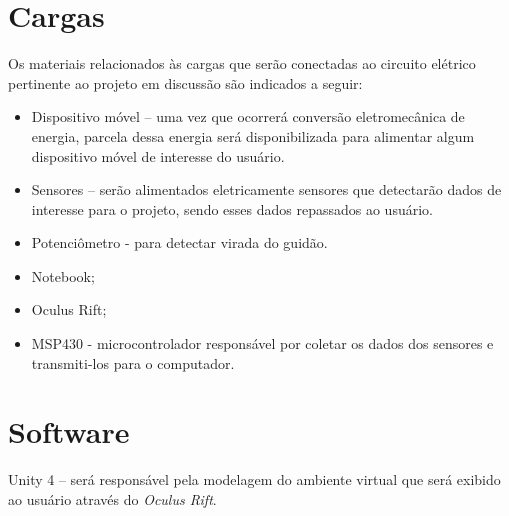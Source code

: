 \section{Cargas}

Os materiais relacionados às cargas que serão conectadas ao circuito elétrico pertinente ao projeto em discussão são indicados a seguir:

\begin{itemize}
\item Dispositivo móvel – uma vez que ocorrerá conversão eletromecânica de energia, parcela dessa energia será disponibilizada para alimentar algum
  dispositivo móvel de interesse do usuário.
\item Sensores – serão alimentados eletricamente sensores que detectarão dados de interesse para o projeto, sendo esses dados repassados ao usuário.
\item Potenciômetro - para detectar virada do guidão.
\item Notebook;
\item Oculus Rift;
\item MSP430 - microcontrolador responsável por coletar os dados dos sensores e transmiti-los para o computador.
\end{itemize}

\section{Software}

Unity 4 – será responsável pela modelagem do ambiente virtual que será exibido ao usuário através do \textit{Oculus Rift}.

